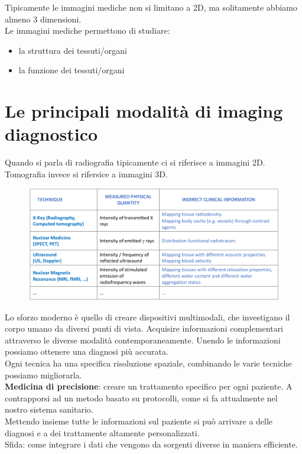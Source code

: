Tipicamente le immagini mediche non si limitano a 2D, ma solitamente abbiamo almeno 3 dimensioni.\\

Le immagini mediche permettono di studiare:
\begin{itemize}
	\item la struttura dei tessuti/organi
	\item la funzione dei tessuti/organi
\end{itemize}

\section{Le principali modalità di imaging diagnostico}
Quando si parla di radiografia tipicamente ci si riferisce a immagini 2D.\\
Tomografia invece si rifersice a immagini 3D.\\

\begin{figure}[ht]
	\centering
	\includegraphics[width=0.8\linewidth]{figure_med/diagnostic}
\end{figure}
\FloatBarrier

Lo sforzo moderno è quello di creare dispositivi multimodali, che investigano il corpo umano da diversi punti di vista. Acquisire informazioni complementari attraverso le diverse modalità contemporaneamente. Unendo le informazioni possiamo ottenere una diagnosi più accurata.\\
Ogni tecnica ha una specifica risoluzione spaziale, combinando le varie tecniche possiamo migliorarla.\\

\textbf{Medicina di precisione}: creare un trattamento specifico per ogni paziente. A contrapporsi ad un metodo basato su protocolli, come si fa attualmente nel nostro sistema sanitario.\\
Mettendo insieme tutte le informazioni sul paziente si può arrivare a delle diagnosi e a dei trattamente altamente personalizzati.\\
Sfida: come integrare i dati che vengono da sorgenti diverse in maniera efficiente.\\

